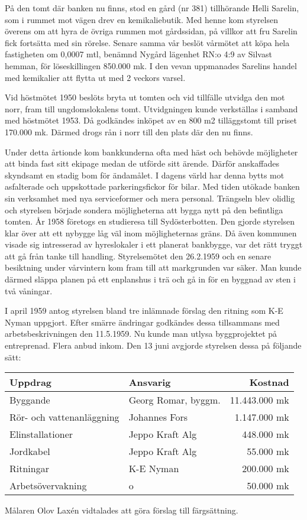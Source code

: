 På den tomt där banken nu finns, stod en gård (nr 381) tillhörande Helli Sarelin, som i rummet mot vägen drev en kemikaliebutik. Med henne kom styrelsen överens om att hyra de övriga rummen mot gårdssidan, på villkor att fru Sarelin fick fortsätta med sin rörelse. Senare samma vår beslöt vårmötet att köpa hela fastigheten om 0,0007 mtl, benämnd Nygård lägenhet RN:o 4:9 av Silvast hemman, för löseskillingen 850.000 mk. I den vevan uppmanades Sarelins handel med kemikalier att flytta ut med 2 veckors varsel.


Vid höstmötet 1950 beslöts bryta ut tomten och vid tillfälle utvidga den mot norr, fram till ungdomslokalens tomt. Utvidgningen kunde verkställas i samband med höstmötet 1953. Då godkändes inköpet av en 800 m2 tilläggstomt till priset 170.000 mk. Därmed drogs rån i norr till den plats där den nu finns.

Under detta årtionde kom bankkunderna ofta med häst och behövde möjligheter att binda fast sitt ekipage medan de utförde sitt ärende. Därför anskaffades skyndsamt en stadig bom för ändamålet. I dagens värld har denna bytts mot asfalterade och uppskottade parkeringsfickor för bilar.
Med tiden utökade banken sin verksamhet med nya serviceformer och mera personal. Trängseln blev olidlig och styrelsen började sondera möjligheterna att bygga nytt på den befintliga tomten. År 1958 företogs en studieresa till Sydösterbotten. Den gjorde styrelsen klar över att ett nybygge låg väl inom möjligheternas gräns. Då även kommunen visade sig intresserad av hyreslokaler i ett planerat bankbygge, var det rätt tryggt att gå från tanke till handling. Styrelsemötet den 26.2.1959 och en senare besiktning under vårvintern kom fram till att markgrunden var säker. Man kunde därmed släppa planen på ett enplanshus i trä och gå in för en byggnad av sten i två våningar.

I april 1959 antog styrelsen bland tre inlämnade förslag den ritning som K-E Nyman uppgjort. Efter smärre ändringar godkändes dessa tillsammans med arbetsbeskrivningen den 11.5.1959. Nu kunde man utlysa byggprojektet på entreprenad. Flera anbud inkom. Den 13 juni avgjorde styrelsen dessa på följande sätt:

\begin{center}
  \begin{tabular}{l l r}
    \hline
    Uppdrag & Ansvarig & Kostnad \\ \hline
    Byggande & Georg Romar, byggm. & 11.443.000 mk \\
    Rör- och vattenanläggning & Johannes Fors & 1.147.000 mk \\
    Elinstallationer & Jeppo Kraft Alg & 448.000 mk \\
    Jordkabel & Jeppo Kraft Alg & 55.000 mk \\
    Ritningar & K-E Nyman & 200.000 mk \\
    Arbetsövervakning & o & 50.000 mk \\
    \hline
  \end{tabular}
\end{center}
Målaren Olov Laxén vidtalades att göra förslag till färgsättning.

